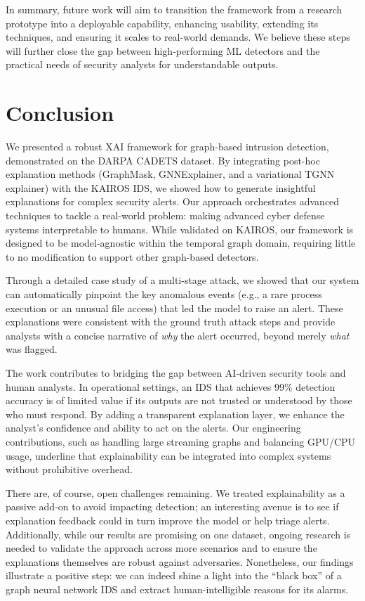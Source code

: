 \documentclass[conference]{IEEEtran}
\begin{document}
In summary, future work will aim to transition the framework from a research prototype into a deployable capability, enhancing usability, extending its techniques, and ensuring it scales to real-world demands. We believe these steps will further close the gap between high-performing ML detectors and the practical needs of security analysts for understandable outputs.

\section{Conclusion}
We presented a robust XAI framework for graph-based intrusion detection, demonstrated on the DARPA CADETS dataset. By integrating post-hoc explanation methods (GraphMask, GNNExplainer, and a variational TGNN explainer) with the KAIROS IDS, we showed how to generate insightful explanations for complex security alerts. Our approach orchestrates advanced techniques to tackle a real-world problem: making advanced cyber defense systems interpretable to humans. While validated on KAIROS, our framework is designed to be model-agnostic within the temporal graph domain, requiring little to no modification to support other graph-based detectors.

Through a detailed case study of a multi-stage attack, we showed that our system can automatically pinpoint the key anomalous events (e.g., a rare process execution or an unusual file access) that led the model to raise an alert. These explanations were consistent with the ground truth attack steps and provide analysts with a concise narrative of \textit{why} the alert occurred, beyond merely \textit{what} was flagged.

The work contributes to bridging the gap between AI-driven security tools and human analysts. In operational settings, an IDS that achieves 99\% detection accuracy is of limited value if its outputs are not trusted or understood by those who must respond. By adding a transparent explanation layer, we enhance the analyst's confidence and ability to act on the alerts. Our engineering contributions, such as handling large streaming graphs and balancing GPU/CPU usage, underline that explainability can be integrated into complex systems without prohibitive overhead.

There are, of course, open challenges remaining. We treated explainability as a passive add-on to avoid impacting detection; an interesting avenue is to see if explanation feedback could in turn improve the model or help triage alerts. Additionally, while our results are promising on one dataset, ongoing research is needed to validate the approach across more scenarios and to ensure the explanations themselves are robust against adversaries. Nonetheless, our findings illustrate a positive step: we can indeed shine a light into the ``black box'' of a graph neural network IDS and extract human-intelligible reasons for its alarms.
\end{document}
